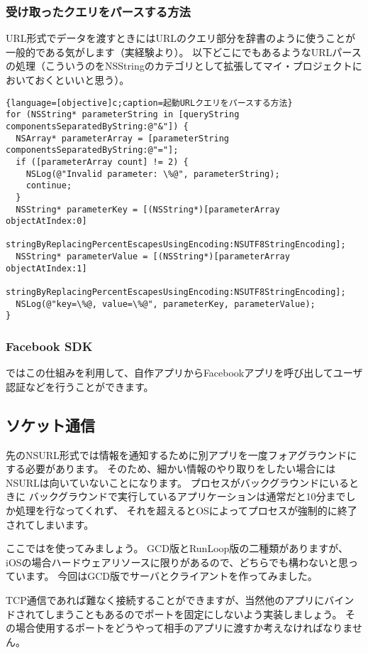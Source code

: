 \subsubsection{受け取ったクエリをパースする方法}
URL形式でデータを渡すときにはURLのクエリ部分を辞書のように使うことが一般的である気がします（実経験より）。
以下どこにでもあるようなURLパースの処理（こういうのをNSStringのカテゴリとして拡張してマイ・プロジェクトにおいておくといいと思う）。
\begin{lstlisting}{language=[objective]c;caption=起動URLクエリをパースする方法}
for (NSString* parameterString in [queryString componentsSeparatedByString:@"&"]) {
  NSArray* parameterArray = [parameterString componentsSeparatedByString:@"="];
  if ([parameterArray count] != 2) {
	NSLog(@"Invalid parameter: \%@", parameterString);
	continue;
  }
  NSString* parameterKey = [(NSString*)[parameterArray objectAtIndex:0]
	stringByReplacingPercentEscapesUsingEncoding:NSUTF8StringEncoding];
  NSString* parameterValue = [(NSString*)[parameterArray objectAtIndex:1]
	stringByReplacingPercentEscapesUsingEncoding:NSUTF8StringEncoding];
  NSLog(@"key=\%@, value=\%@", parameterKey, parameterValue);
}
\end{lstlisting}
\subsubsection{Facebook SDK}
ではこの仕組みを利用して、自作アプリからFacebookアプリを呼び出してユーザ認証などを行うことができます。

\subsection{ソケット通信}
先のNSURL形式では情報を通知するために別アプリを一度フォアグラウンドにする必要があります。
そのため、細かい情報のやり取りをしたい場合にはNSURLは向いていないことになります。
プロセスがバックグラウンドにいるときに
バックグラウンドで実行しているアプリケーションは通常だと10分までしか処理を行なってくれず、
それを超えるとOSによってプロセスが強制的に終了されてしまいます。

ここではを使ってみましょう。
GCD版とRunLoop版の二種類がありますが、iOSの場合ハードウェアリソースに限りがあるので、どちらでも構わないと思っています。
今回はGCD版でサーバとクライアントを作ってみました。

TCP通信であれば難なく接続することができますが、当然他のアプリにバインドされてしまうこともあるのでポートを固定にしないよう実装しましょう。
その場合使用するポートをどうやって相手のアプリに渡すか考えなければなりません。

